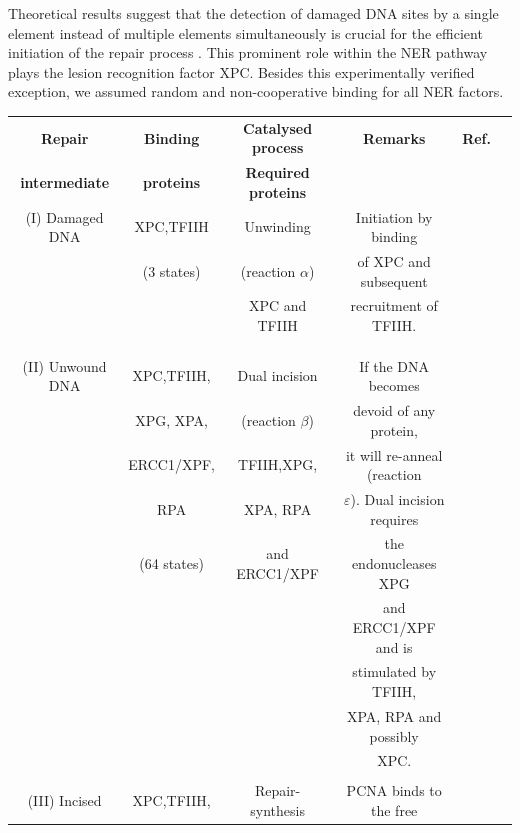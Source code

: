 Theoretical results suggest that the detection of damaged DNA sites by a single element instead of multiple elements simultaneously is crucial for the efficient initiation of the repair process \cite{Politi2005,Volker2001}. This prominent role within the NER pathway plays the lesion recognition factor XPC. Besides this experimentally verified exception, we assumed random and non-cooperative binding for all NER factors.\\ 
\begin{table}[t!]
	\small{
		\begin{tabular}{cccccc}
			\hline
			\rule{0pt}{2ex}
			\textbf{Repair}&\textbf{Binding} &	\textbf{Catalysed  process}&\textbf{Remarks}  	&\textbf{Ref.} \\ 
			\textbf{intermediate}&	\textbf{proteins} &	\textbf{Required proteins}&	& \\ \hline
			\rule{0pt}{3ex}
			(I) Damaged DNA&	XPC,TFIIH 	&Unwinding &Initiation by binding	&\cite{Evans1997a}
			\\ 
			&	(3 states)& (reaction $\alpha$)&  of XPC and subsequent &\cite{Riedl2003}\\
			&&XPC and TFIIH&	 recruitment of TFIIH. &\cite{Yokoi:2000:J-Biol-Chem:10734143}\\ 
			&&&&\cite{Rademakers2003}\\ 
			&&&& \cite{Volker2001} \\ 
			&&&&\\\hline
			\rule{0pt}{3ex}
			(II) Unwound DNA&XPC,TFIIH,&Dual incision &If the DNA becomes &\cite{Evans1997a} \\
			& XPG, XPA,&(reaction $\beta$)&devoid of any protein,&\cite{ODonovan:1994:Nature:8090225}\\
			&ERCC1/XPF,&TFIIH,XPG,&it will re-anneal (reaction &\cite{Sijbers:1996:Cell:8797827}\\
			&  RPA& XPA,  RPA&$\varepsilon$). Dual incision requires&\cite{Winkler2001}\\
			&(64 states)&and ERCC1/XPF&the endonucleases XPG& \cite{deLaat:1998:Genes-Dev:9716411}\\
			&&&  and ERCC1/XPF and is&\\
			&&&stimulated by TFIIH, &\\
			&&&XPA, RPA and possibly &\\
			&&&XPC.&\\
			&&&& \\ \hline
			\rule{0pt}{3ex}
			(III) Incised&XPC,TFIIH,&Repair-synthesis&PCNA binds to the free&\cite{Evans1997a}\\

\end{tabular}}
\end{table}
